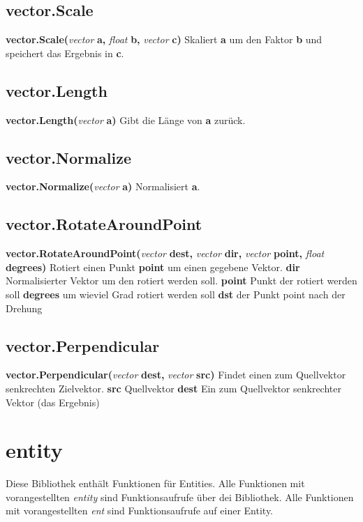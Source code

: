 \documentclass[11pt,a4paper]{book}
\begin{document}
\subsection{vector.Scale}
\label{vect-scale}
\textbf{vector.Scale(}\textit{vector}\textbf{ a, }\textit{float}\textbf{ b, }\textit{vector}\textbf{ c)}
\newline
Skaliert \textbf{a} um den Faktor \textbf{b} und speichert das Ergebnis in \textbf{c}.
\subsection{vector.Length}
\label{vect-length}
\textbf{vector.Length(}\textit{vector}\textbf{ a)}
\newline
Gibt die Länge von \textbf{a} zurück.
\subsection{vector.Normalize}
\label{vect-norm}
\textbf{vector.Normalize(}\textit{vector}\textbf{ a)}
\newline
Normalisiert \textbf{a}.
\subsection{vector.RotateAroundPoint}
\label{vect-rotarndpnt}
\textbf{vector.RotateAroundPoint(}\textit{vector}\textbf{ dest, }\textit{vector}\textbf{ dir, }\textit{vector}\textbf{ point, }\textit{float}\textbf{ degrees)}
\newline
Rotiert einen Punkt \textbf{point} um einen gegebene Vektor.
\newline
\textbf{dir} Normalisierter Vektor um den rotiert werden soll.
\newline
\textbf{point} Punkt der rotiert werden soll
\newline
\textbf{degrees} um wieviel Grad rotiert werden soll
\newline
\textbf{dst} der Punkt point nach der Drehung
\subsection{vector.Perpendicular}
\label{vect-Perpendicular}
\textbf{vector.Perpendicular(}\textit{vector}\textbf{ dest, }\textit{vector}\textbf{ src)}
\newline
Findet einen zum Quellvektor senkrechten Zielvektor.
\textbf{src} Quellvektor
\textbf{dest} Ein zum Quellvektor senkrechter Vektor (das Ergebnis)
\newpage
\section{entity}
\label{enty}
Diese Bibliothek enthält Funktionen für Entities. Alle Funktionen mit vorangestellten \textit{entity}  sind Funktionsaufrufe über dei Bibliothek. Alle Funktionen mit vorangestellten \textit{ent} sind Funktionsaufrufe auf einer Entity.
\end{document}
